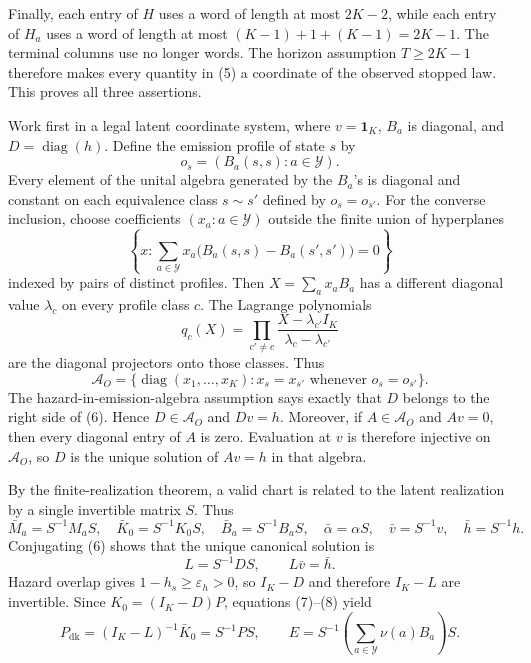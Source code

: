 Finally, each entry of \(H\) uses a word of length at most \(2K-2\), while each entry of \(H_a\) uses a word of length at most \((K-1)+1+(K-1)=2K-1\).  The terminal columns use no longer words.  The horizon assumption \(T\ge2K-1\) therefore makes every quantity in (5) a coordinate of the observed stopped law.  This proves all three assertions.

Work first in a legal latent coordinate system, where \(v=\mathbf 1_K\), \(B_a\) is diagonal, and \(D=\operatorname{diag}(h)\).  Define the emission profile of state \(s\) by
\[
 o_s=(B_a(s,s):a\in\mathcal Y).
\]
Every element of the unital algebra generated by the \(B_a\)'s is diagonal and constant on each equivalence class \(s\sim s'\) defined by \(o_s=o_{s'}\).  For the converse inclusion, choose coefficients \((x_a:a\in\mathcal Y)\) outside the finite union of hyperplanes
\[
 \left\{x:\sum_{a\in\mathcal Y}x_a\bigl(B_a(s,s)-B_a(s',s')\bigr)=0\right\}
\]
indexed by pairs of distinct profiles.  Then \(X=\sum_a x_aB_a\) has a different diagonal value \(\lambda_c\) on every profile class \(c\).  The Lagrange polynomials
\[
 q_c(X)=\prod_{c'\ne c}\frac{X-\lambda_{c'}I_K}{\lambda_c-\lambda_{c'}}
\]
are the diagonal projectors onto those classes.  Thus
\[
 \mathcal A_O
 =\{\operatorname{diag}(x_1,\ldots,x_K):x_s=x_{s'}\text{ whenever }o_s=o_{s'}\}.       \tag{6}
\]
The hazard-in-emission-algebra assumption says exactly that \(D\) belongs to the right side of (6).  Hence \(D\in\mathcal A_O\) and \(Dv=h\).  Moreover, if \(A\in\mathcal A_O\) and \(Av=0\), then every diagonal entry of \(A\) is zero.  Evaluation at \(v\) is therefore injective on \(\mathcal A_O\), so \(D\) is the unique solution of \(Av=h\) in that algebra.

By the finite-realization theorem, a valid chart is related to the latent realization by a single invertible matrix \(S\).  Thus
\[
 \bar M_a=S^{-1}M_aS,
 \quad \bar K_0=S^{-1}K_0S,
 \quad \bar B_a=S^{-1}B_aS,
 \quad \bar\alpha=\alpha S,
 \quad \bar v=S^{-1}v,
 \quad \bar h=S^{-1}h.                                        \tag{7}
\]
Conjugating (6) shows that the unique canonical solution is
\[
 L=S^{-1}DS,
 \qquad L\bar v=\bar h.                                      \tag{8}
\]
Hazard overlap gives \(1-h_s\ge\varepsilon_h>0\), so \(I_K-D\) and therefore \(I_K-L\) are invertible.  Since \(K_0=(I_K-D)P\), equations (7)--(8) yield
\[
 P_{\mathrm{dk}}=(I_K-L)^{-1}\bar K_0=S^{-1}PS,
 \qquad
 E=S^{-1}\left(\sum_{a\in\mathcal Y}\nu(a)B_a\right)S.     \tag{9}
\]

